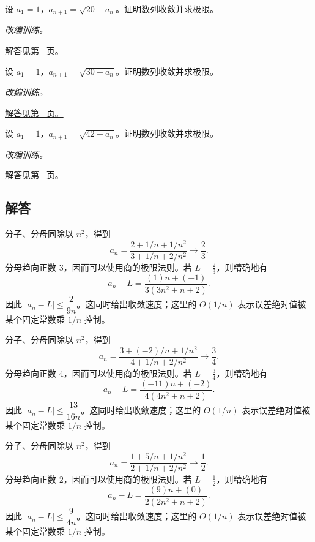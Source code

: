 \documentclass[12pt,fontset=fandol]{ctexart}
\begin{document}
\begin{example}[根式递推与单调有界]\label{ex:c1q22}
设 $a_1=1$，$a_{n+1}=\sqrt{20+a_n}$。证明数列收敛并求极限。
\par\textit{改编训练。}\par\hyperref[ans:c1q22]{解答见第~\pageref{ans:c1q22} 页。}
\end{example}
\begin{example}[根式递推与单调有界]\label{ex:c1q23}
设 $a_1=1$，$a_{n+1}=\sqrt{30+a_n}$。证明数列收敛并求极限。
\par\textit{改编训练。}\par\hyperref[ans:c1q23]{解答见第~\pageref{ans:c1q23} 页。}
\end{example}
\begin{example}[根式递推与单调有界]\label{ex:c1q24}
设 $a_1=1$，$a_{n+1}=\sqrt{42+a_n}$。证明数列收敛并求极限。
\par\textit{改编训练。}\par\hyperref[ans:c1q24]{解答见第~\pageref{ans:c1q24} 页。}
\end{example}
\subsection{解答}
\begin{solve}\label{ans:c1q1}
分子、分母同除以 $n^2$，得到
\[
a_n=\frac{2+1/n+1/n^2}{3+1/n+2/n^2}\longrightarrow \frac{2}{3}.
\]
分母趋向正数 $3$，因而可以使用商的极限法则。若 $L=\frac{2}{3}$，则精确地有
\[
a_n-L=\frac{(1)n+(-1)}{3(3n^2+n+2)}.
\]
因此 $|a_n-L|\le\dfrac{2}{9n}$。这同时给出收敛速度；这里的 $O(1/n)$ 表示误差绝对值被某个固定常数乘 $1/n$ 控制。
\end{solve}

\begin{solve}\label{ans:c1q2}
分子、分母同除以 $n^2$，得到
\[
a_n=\frac{3+(-2)/n+1/n^2}{4+1/n+2/n^2}\longrightarrow \frac{3}{4}.
\]
分母趋向正数 $4$，因而可以使用商的极限法则。若 $L=\frac{3}{4}$，则精确地有
\[
a_n-L=\frac{(-11)n+(-2)}{4(4n^2+n+2)}.
\]
因此 $|a_n-L|\le\dfrac{13}{16n}$。这同时给出收敛速度；这里的 $O(1/n)$ 表示误差绝对值被某个固定常数乘 $1/n$ 控制。
\end{solve}

\begin{solve}\label{ans:c1q3}
分子、分母同除以 $n^2$，得到
\[
a_n=\frac{1+5/n+1/n^2}{2+1/n+2/n^2}\longrightarrow \frac{1}{2}.
\]
分母趋向正数 $2$，因而可以使用商的极限法则。若 $L=\frac{1}{2}$，则精确地有
\[
a_n-L=\frac{(9)n+(0)}{2(2n^2+n+2)}.
\]
因此 $|a_n-L|\le\dfrac{9}{4n}$。这同时给出收敛速度；这里的 $O(1/n)$ 表示误差绝对值被某个固定常数乘 $1/n$ 控制。
\end{solve}
\end{document}
